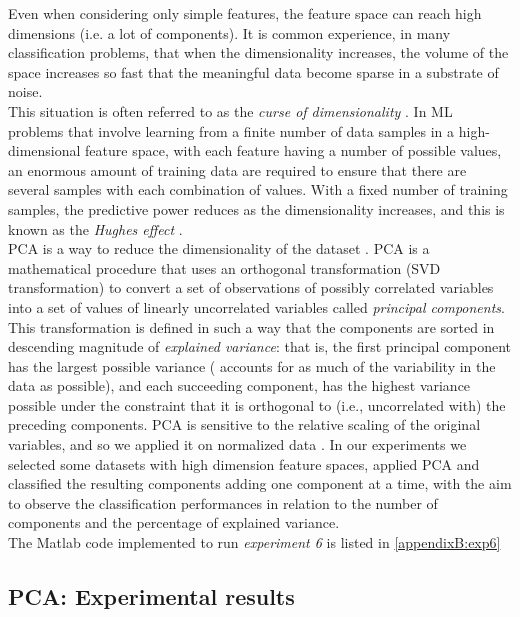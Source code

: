 Even when considering only simple features, the feature space can reach high dimensions (i.e. a lot of components). It is common experience,
in many classification problems, that when the dimensionality increases, the volume of the space increases so fast that the meaningful data become sparse
in a substrate of noise.\\
This situation is often referred to as the \textit{curse of dimensionality} \cite{bellmandynamic}.
In \Gls{ML} problems that involve learning from a finite number of data samples in a high-dimensional feature space,
with each feature having a number of possible values, an enormous amount of training data are required to ensure that there are several samples with each combination of values.
With a fixed number of training samples, the predictive power reduces as the dimensionality increases, and this is known as the \textit{Hughes effect} \cite{hughes}.\\
\Gls{PCA} is a way to reduce the dimensionality of the dataset \cite{PCA_jolliffe}. \Gls{PCA} is a mathematical procedure that uses an orthogonal transformation
(SVD transformation) to convert a set of observations of possibly correlated variables into a set of values of linearly uncorrelated variables called \textit{principal components}.
This transformation is defined in such a way that the components are sorted in descending magnitude of \textit{explained variance}: that is, the first principal component
has the largest possible variance ( accounts for as much of the variability in the data as possible), and each succeeding component, has the highest variance possible under the constraint
that it is orthogonal to (i.e., uncorrelated with) the preceding components. \Gls{PCA} is sensitive to the relative scaling of the original variables, 
and so we applied it on normalized data \cite{PCA02_applications}.
In our experiments we selected some datasets with high dimension feature spaces, applied \Gls{PCA} and classified the resulting components adding one component at a time, with the aim to
observe the classification performances in relation to the number of components and the percentage of explained variance.
\\
The Matlab code implemented to run \textit{experiment 6} is listed in \ref{appendixB:exp6}


\vspace{0.5cm}

\subsection{PCA: Experimental results}

